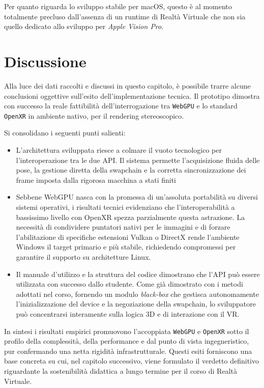 \documentclass[a4paper, 11pt, twoside]{report}
\begin{document}
Per quanto riguarda lo sviluppo stabile per macOS, questo è al momento totalmente precluso dall'assenza di un runtime
di Realtà Virtuale che non sia quello dedicato allo sviluppo per \textit{Apple Vision Pro}.

\section{Discussione}

Alla luce dei dati raccolti e discussi in questo capitolo, è possibile trarre alcune conclusioni oggettive sull'esito
dell'implementazione tecnica. Il prototipo dimostra con successo la reale fattibilità dell'interrogazione tra
\texttt{WebGPU} e lo standard \texttt{\gls{OpenXR}} in ambiente nativo, per il rendering stereoscopico.

Si consolidano i seguenti punti salienti:

\begin{itemize}
    \item L'architettura sviluppata riesce a colmare il vuoto tecnologico per l'interoperazione tra le due API. Il
        sistema permette l'acquisizione fluida delle pose, la gestione diretta della swapchain e la corretta
        sincronizzazione dei frame imposta dalla rigorosa macchina a stati finiti
    \item Sebbene WebGPU nasca con la promessa di un'assoluta portabilità su diversi sistemi operativi, i risultati
        tecnici evidenziano che l'interoperabilità a bassissimo livello con OpenXR spezza parzialmente questa astrazione.
        La necessità di condividere puntatori nativi per le immagini e di forzare l'abilitazione di specifiche
        estensioni Vulkan o DirectX rende l'ambiente Windows il target primario e più stabile, richiedendo compromessi
        per garantire il supporto su architetture Linux.
    \item Il manuale d'utilizzo e la struttura del codice dimostrano che l'API può essere utilizzata con successo dallo
        studente. Come già dimostrato con i metodi adottati nel corso, fornendo un modulo \textit{black-box} che
        gestisca autonomamente l'inizializzazione del device e la negoziazione della swapchain, lo sviluppatore può
        concentrarsi interamente sulla logica 3D e di interazione con il VR.
\end{itemize}

In sintesi i risultati empirici promuovono l'accoppiata \texttt{WebGPU} e \texttt{\gls{OpenXR}} sotto il profilo della
complessità, della performance e dal punto di vista ingegneristico, pur confermando una netta rigidità infrastrutturale.
Questi esiti forniscono una base concreta su cui, nel capitolo successivo, viene formulato il verdetto definitivo
riguardante la sostenibilità didattica a lungo termine per il corso di Realtà Virtuale.
\end{document}
